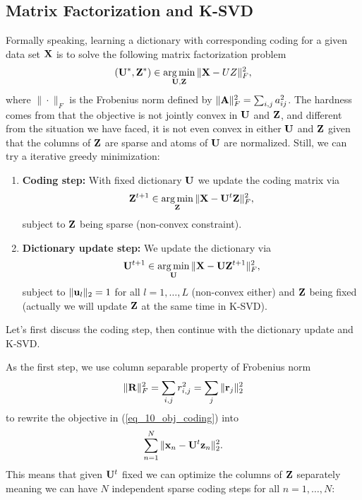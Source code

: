 \documentclass[../main.tex]{subfiles}
\begin{document}
\subsection{Matrix Factorization and K-SVD}
Formally speaking, learning a dictionary with corresponding coding for a given data set ${\bf X}$ is to solve the following matrix factorization problem
\begin{equation*}
({\bf U^*,Z^*})\in \mathop{\arg\min}_{{\bf U,Z}}\|{\bf X}-UZ\|^2_F,
\end{equation*}
where $\|\cdot\|_F$ is the Frobenius norm defined by $\|{\bf A}\|_F^2=\sum_{i,j}a_{ij}^2$. The hardness comes from that the objective is not jointly convex in ${\bf U}$ and ${\bf Z}$, and different from the situation we have faced, it is not even convex in either ${\bf U}$ and ${\bf Z}$ given that the columns of ${\bf Z}$ are sparse and atoms of ${\bf U}$ are normalized. Still, we can try a iterative greedy minimization:
\begin{enumerate}
	\item \textbf{Coding step:} With fixed dictionary ${\bf U}$ we update the coding matrix via
	\begin{equation}\label{eq_10_obj_coding}
	{\bf Z}^{t+1}\in \mathop{\arg\min}_{\bf Z} \|{\bf X}-{\bf U}^t{\bf Z}\|_F^2,
	\end{equation}
	subject to ${\bf Z}$ being sparse (non-convex constraint).
	\item \textbf{Dictionary update step:} We update the dictionary via
	\begin{equation}\label{eq_10_obj_dic}
	{\bf U}^{t+1}\in \mathop{\arg\min}_{\bf U} \|{\bf X}-{\bf U}{\bf Z}^{t+1}\|_F^2,
	\end{equation}
	subject to $\|{\bf u}_l\|_2=1$ for all $l=1,\dots,L$ (non-convex either) and ${\bf Z}$ being fixed (actually we will update ${\bf Z}$ at the same time in K-SVD).
\end{enumerate}
Let's first discuss the coding step, then continue with the dictionary update and K-SVD.
\par As the first step, we use column separable property of Frobenius norm
\begin{equation*}
\|{\bf R}\|^2_F = \sum_{i,j}r_{i,j}^2 = \sum_j \|{\bf r}_j\|_2^2
\end{equation*}
to rewrite the objective in (\ref{eq_10_obj_coding}) into
\begin{equation*}
\sum_{n=1}^N\|{\bf x}_n-{\bf U}^t {\bf z}_n\|_2^2.
\end{equation*}
This means that given ${\bf U}^t$ fixed  we can optimize the columns of ${\bf Z}$ separately meaning we can have $N$ independent sparse coding steps for all $n=1,\dots,N$:
\end{document}
